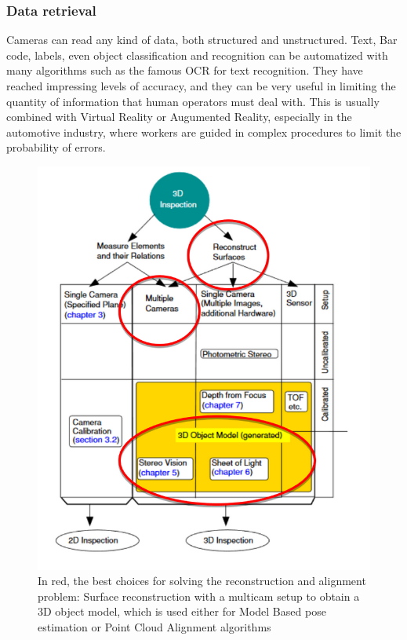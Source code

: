 \documentclass[12pt,a4paper]{article}
\begin{document}
\subsubsection{Data retrieval}
Cameras can read any kind of data, both structured and unstructured. Text, Bar code, labels, even object classification and recognition can be automatized with many algorithms such as the famous OCR for text recognition. They have reached impressing levels of accuracy, and they can be very useful in limiting the quantity of information that human operators must deal with. This is usually combined with Virtual Reality or Augumented Reality, especially in the automotive industry, where workers are guided in complex procedures to limit the probability of errors.  
\begin{figure}[h!]
\centering
\includegraphics[width=\textwidth]{12.png}
\caption{In red, the best choices for solving the reconstruction and alignment problem: Surface reconstruction with a multicam setup to obtain a 3D object model, which is used either for Model Based pose estimation or Point Cloud Alignment algorithms}
\end{figure}
\clearpage
\end{document}
